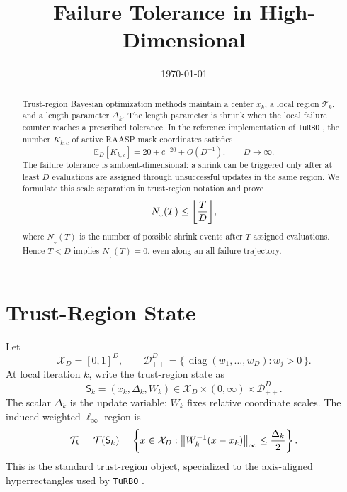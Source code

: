 \documentclass[10pt]{article}
\title{\vspace{-2.2em}Failure Tolerance in High-Dimensional \TuRBO{}}
\author{}
\date{\vspace{-1.2em}\today\vspace{-1.2em}}
\numberwithin{equation}{section}
\newcommand{\TuRBO}{\textnormal{\texttt{TuRBO}}}
\newcommand{\X}{\mathcal{X}}
\newcommand{\OmegaD}{\X_D}
\newcommand{\Dpos}{\mathcal{D}_{++}^{D}}
\newcommand{\TR}{\mathcal{T}}
\DeclareMathOperator{\diag}{diag}
\DeclarePairedDelimiter{\norm}{\lVert}{\rVert}
\DeclarePairedDelimiter{\floor}{\lfloor}{\rfloor}
\theoremstyle{plain}
\theoremstyle{definition}
\theoremstyle{remark}
\begin{document}
\maketitle

\begin{abstract}
Trust-region Bayesian optimization methods maintain a center \(x_k\), a local
region \(\TR_k\), and a length parameter \(\Delta_k\).  The length parameter is
shrunk when the local failure counter reaches a prescribed tolerance.  In the
reference implementation of \TuRBO{} \cite{eriksson2019turbo,turboCode}, the
number \(K_{k,c}\) of active RAASP mask coordinates satisfies
\[
  \mathbb{E}_D\!\left[K_{k,c}\right]=20+e^{-20}+O(D^{-1}),
  \qquad D\to\infty .
\]
The failure tolerance is ambient-dimensional: a shrink can be triggered only
after at least \(D\) evaluations are assigned through unsuccessful updates in
the same region.  We formulate this scale separation in trust-region notation
and prove
\[
  N_{\downarrow}(T)\le \floor*{\frac{T}{D}},
\]
where \(N_{\downarrow}(T)\) is the number of possible shrink events after
\(T\) assigned evaluations.  Hence \(T<D\) implies
\(N_{\downarrow}(T)=0\), even along an all-failure trajectory.
\end{abstract}

\section{Trust-Region State}

Let
\[
  \OmegaD=[0,1]^D,
  \qquad
  \Dpos=\{\,\diag(w_1,\ldots,w_D):w_j>0\,\}.
\]
At local iteration \(k\), write the trust-region state as
\begin{equation}
  \mathsf S_k=(x_k,\Delta_k,W_k)
  \in
  \OmegaD\times(0,\infty)\times\Dpos .
  \label{eq:tr-state}
\end{equation}
The scalar \(\Delta_k\) is the update variable; \(W_k\) fixes relative
coordinate scales.  The induced weighted \(\ell_\infty\) region is
\begin{equation}
  \TR_k
  =
  \TR(\mathsf S_k)
  =
  \left\{
    x\in\OmegaD:
    \norm*{W_k^{-1}(x-x_k)}_\infty
    \le
    \frac{\Delta_k}{2}
  \right\}.
  \label{eq:trust-region}
\end{equation}
This is the standard trust-region object, specialized to the axis-aligned
hyperrectangles used by \TuRBO{} \cite{conn2000trust,eriksson2019turbo}.
\end{document}
